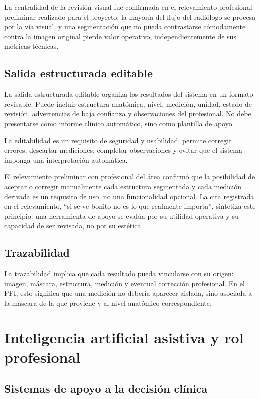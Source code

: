 La centralidad de la revisión visual fue confirmada en el relevamiento profesional preliminar realizado para el proyecto: la mayoría del flujo del radiólogo se procesa por la vía visual, y una segmentación que no pueda contrastarse cómodamente contra la imagen original pierde valor operativo, independientemente de sus métricas técnicas.

\subsection{Salida estructurada editable}

La salida estructurada editable organiza los resultados del sistema en un formato revisable. Puede incluir estructura anatómica, nivel, medición, unidad, estado de revisión, advertencias de baja confianza y observaciones del profesional. No debe presentarse como informe clínico automático, sino como plantilla de apoyo.

La editabilidad es un requisito de seguridad y usabilidad: permite corregir errores, descartar mediciones, completar observaciones y evitar que el sistema imponga una interpretación automática.

El relevamiento preliminar con profesional del área confirmó que la posibilidad de aceptar o corregir manualmente cada estructura segmentada y cada medición derivada es un requisito de uso, no una funcionalidad opcional. La cita registrada en el relevamiento, ``si se ve bonito no es lo que realmente importa'', sintetiza este principio: una herramienta de apoyo se evalúa por su utilidad operativa y su capacidad de ser revisada, no por su estética.

\subsection{Trazabilidad}

La trazabilidad implica que cada resultado pueda vincularse con su origen: imagen, máscara, estructura, medición y eventual corrección profesional. En el PFI, esto significa que una medición no debería aparecer aislada, sino asociada a la máscara de la que proviene y al nivel anatómico correspondiente.

\section{Inteligencia artificial asistiva y rol profesional}

\subsection{Sistemas de apoyo a la decisión clínica}

